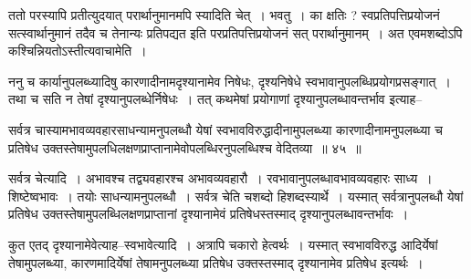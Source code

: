 \documentclass[article,12pt,a4paper]{memoir}
\begin{document}
	  \pstart ततो परस्यापि प्रतीत्युदयात् परार्थानुमानमपि स्यादिति चेत् । भवतु । का क्षतिः ? स्वप्रतिपत्तिप्रयोजनं सत्स्वार्थानुमानं तदैव च तेनान्यः प्रतिपद्यत इति परप्रतिपत्तिप्रयोजनं सत् परार्थानुमानम् । अत एवमशब्दोऽपि कश्चिन्नियतोऽस्तीत्यवाचामेति ।
	\pend
	  \bigskip
	  \begingroup
	

	  \pstart ननु च कार्यानुपलब्ध्यादिषु कारणादीनामदृश्यानामेव निषेधः, दृश्यनिषेधे स्वभावानुपलब्धिप्रयोगप्रसङ्गात् । तथा च सति न तेषां दृश्यानुपलब्धेर्निषेधः । तत् कथमेषां प्रयोगाणां दृश्यानुपलब्धावन्तर्भाव इत्याह--
	\pend
        
	  \bigskip
	  \begingroup
	

	  \pstart सर्वत्र चास्यामभावव्यवहारसाधन्यामनुपलब्धौ येषां स्वभावविरुद्धादीनामुपलब्ध्या कारणादीनामनुपलब्ध्या च प्रतिषेध उक्तस्तेषामुपलधिलक्षणप्राप्तानामेवोपलब्धिरनुपलब्धिश्च वेदितव्या ॥ ४५ ॥
	\pend
      
	  \endgroup
	 

	  \pstart {}सर्वत्र चेत्यादि । अभावश्च तद्व्यवहारश्च अभावव्यवहारौ । रवभावानुपलब्धावभावव्यवहारः साध्य । शिष्टेष्वभावः । तयोः साधन्यामनुपलब्धौ । सर्वत्र चेति चशब्दो हिशब्दस्यार्थे । यस्मात् सर्वत्रानुपलब्धौ येषां प्रतिषेध उक्तस्तेषामुपलब्धिलक्षणप्राप्तानां दृश्यानामेवं प्रतिषेधस्तस्माद् दृश्यानुपलब्धावन्तर्भावः ।
	\pend
        

	  \pstart कुत एतद् दृश्यानामेवेत्याह--स्वभावेत्यादि । अत्रापि चकारो हेत्वर्थः । यस्मात् स्वभावविरुद्ध आदिर्येषां तेषामुपलब्ध्या, कारणमादिर्येषां तेषामनुपलब्ध्या प्रतिषेध उक्तस्तस्माद् दृश्यानामेव प्रतिषेध इत्यर्थः ।
	\pend
        
\end{document}
